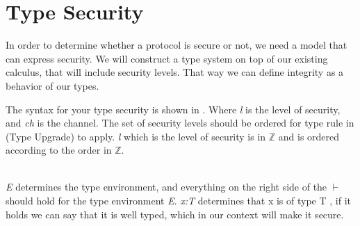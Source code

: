 \section{Type Security}
In order to determine whether a protocol is secure or not, we need a model that can express security.
We will construct a type system on top of our existing calculus, that will include security levels.
That way we can define integrity as a behavior of our types.


\noindent The syntax for your type security is shown in . Where \textit{l} is the level of security, and \textit{ch} is the channel. The set of security levels should be ordered for type rule in  (Type Upgrade) to apply. \textit{l} which is the level of security is in $ \mathbb{Z} $ and is ordered according to the order in $ \mathbb{Z} $.\\\\


\noindent \textit{E} determines the type environment, and everything on the right side of the $ \vdash $ should hold for the type environment \textit{E}. \textit{x:T} determines that x is of type T , if it holds we can say that it is well typed, which in our context will make it secure.

